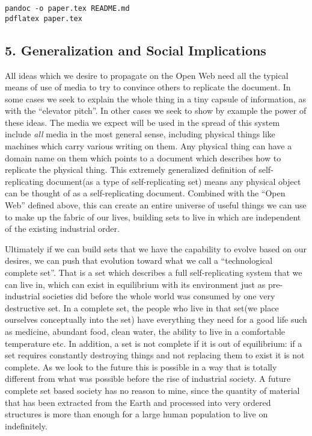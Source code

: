 \documentclass[12pt,a4paper]{amsart}
\numberwithin{equation}{section}
\begin{document}
\begin{verbatim}
pandoc -o paper.tex README.md
pdflatex paper.tex
\end{verbatim}

\subsection{5. Generalization and Social
Implications}\label{generalization-and-social-implications}

All ideas which we desire to propagate on the Open Web need all the
typical means of use of media to try to convince others to replicate the
document. In some cases we seek to explain the whole thing in a tiny
capsule of information, as with the ``elevator pitch''. In other cases
we seek to show by example the power of these ideas. The media we expect
will be used in the spread of this system include \emph{all} media in
the most general sense, including physical things like machines which
carry various writing on them. Any physical thing can have a domain name
on them which points to a document which describes how to replicate the
physical thing. This extremely generalized definition of
self-replicating document(as a type of self-replicating set) means any
physical object can be thought of as a self-replicating document.
Combined with the ``Open Web'' defined above, this can create an entire
universe of useful things we can use to make up the fabric of our lives,
building sets to live in which are independent of the existing
industrial order.

Ultimately if we can build sets that we have the capability to evolve
based on our desires, we can push that evolution toward what we call a
``technological complete set''. That is a set which describes a full
self-replicating system that we can live in, which can exist in
equilibrium with its environment just as pre-industrial societies did
before the whole world was consumed by one very destructive set. In a
complete set, the people who live in that set(we place ourselves
conceptually into the set) have everything they need for a good life
such as medicine, abundant food, clean water, the ability to live in a
comfortable temperature etc. In addition, a set is not complete if it is
out of equilibrium: if a set requires constantly destroying things and
not replacing them to exist it is not complete. As we look to the future
this is possible in a way that is totally different from what was
possible before the rise of industrial society. A future complete set
based society has no reason to mine, since the quantity of material that
has been extracted from the Earth and processed into very ordered
structures is more than enough for a large human population to live on
indefinitely.
\end{document}
